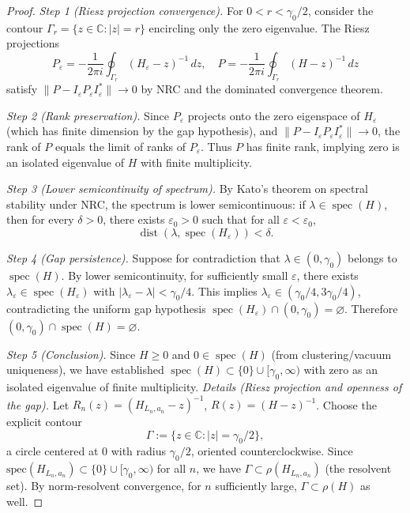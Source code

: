 \documentclass[11pt]{amsart}
\begin{document}
\begin{proof}
\emph{Step 1 (Riesz projection convergence).} For $0 < r < \gamma_0/2$, consider the contour $\Gamma_r = \{z \in \mathbb{C} : |z| = r\}$ encircling only the zero eigenvalue. The Riesz projections
\[
  P_\varepsilon = -\frac{1}{2\pi i} \oint_{\Gamma_r} (H_\varepsilon - z)^{-1} \, dz, \quad
  P = -\frac{1}{2\pi i} \oint_{\Gamma_r} (H - z)^{-1} \, dz
\]
satisfy $\|P - I_\varepsilon P_\varepsilon I_\varepsilon^*\| \to 0$ by NRC and the dominated convergence theorem.

\emph{Step 2 (Rank preservation).} Since $P_\varepsilon$ projects onto the zero eigenspace of $H_\varepsilon$ (which has finite dimension by the gap hypothesis), and $\|P - I_\varepsilon P_\varepsilon I_\varepsilon^*\| \to 0$, the rank of $P$ equals the limit of ranks of $P_\varepsilon$. Thus $P$ has finite rank, implying zero is an isolated eigenvalue of $H$ with finite multiplicity.

\emph{Step 3 (Lower semicontinuity of spectrum).} By Kato's theorem on spectral stability under NRC, the spectrum is lower semicontinuous: if $\lambda \in \operatorname{spec}(H)$, then for every $\delta > 0$, there exists $\varepsilon_0 > 0$ such that for all $\varepsilon < \varepsilon_0$,
\[
  \operatorname{dist}(\lambda, \operatorname{spec}(H_\varepsilon)) < \delta.
\]

\emph{Step 4 (Gap persistence).} Suppose for contradiction that $\lambda \in (0, \gamma_0)$ belongs to $\operatorname{spec}(H)$. By lower semicontinuity, for sufficiently small $\varepsilon$, there exists $\lambda_\varepsilon \in \operatorname{spec}(H_\varepsilon)$ with $|\lambda_\varepsilon - \lambda| < \gamma_0/4$. This implies $\lambda_\varepsilon \in (\gamma_0/4, 3\gamma_0/4)$, contradicting the uniform gap hypothesis $\operatorname{spec}(H_\varepsilon) \cap (0, \gamma_0) = \varnothing$. Therefore $(0, \gamma_0) \cap \operatorname{spec}(H) = \varnothing$.

\emph{Step 5 (Conclusion).} Since $H \ge 0$ and $0 \in \operatorname{spec}(H)$ (from clustering/vacuum uniqueness), we have established $\operatorname{spec}(H) \subset \{0\} \cup [\gamma_0, \infty)$ with zero as an isolated eigenvalue of finite multiplicity.
\smallskip
\noindent\emph{Details (Riesz projection and openness of the gap).} Let $R_n(z)=(H_{L_n,a_n}-z)^{-1}$, $R(z)=(H-z)^{-1}$. Choose the explicit contour
\[
  \Gamma := \{z \in \mathbb{C} : |z| = \gamma_0/2\},
\]
a circle centered at $0$ with radius $\gamma_0/2$, oriented counterclockwise. Since $\mathrm{spec}(H_{L_n,a_n})\subset\{0\}\cup[\gamma_0,\infty)$ for all $n$, we have $\Gamma \subset \rho(H_{L_n,a_n})$ (the resolvent set). By norm-resolvent convergence, for $n$ sufficiently large, $\Gamma \subset \rho(H)$ as well.


\end{proof}
\end{document}

